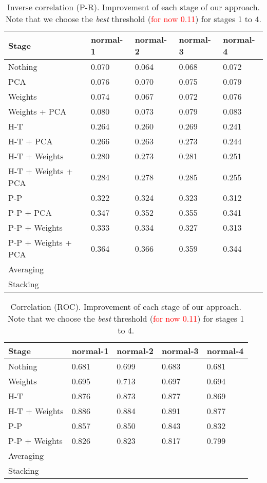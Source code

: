\documentclass[wcp]{jmlr}
\begin{document}
\begin{table}[H]
\centering
\caption{Inverse correlation (P-R). Improvement of each stage of our approach. Note that we choose the
         \textit{best} threshold (\textcolor{red}{for now 0.11}) for stages 1 to 4.}
\begin{tabular}{*{5}{l}}
\toprule
Stage               & normal-1 & normal-2 & normal-3 & normal-4 \\
\midrule
Nothing             & 0.070 & 0.064 & 0.068 & 0.072\\
PCA                 & 0.076 & 0.070 & 0.075 & 0.079\\
Weights             & 0.074 & 0.067 & 0.072 & 0.076\\
Weights + PCA       & 0.080 & 0.073 & 0.079 & 0.083\\
H-T                 & 0.264 & 0.260 & 0.269 & 0.241\\
H-T + PCA           & 0.266 & 0.263 & 0.273 & 0.244\\
H-T + Weights       & 0.280 & 0.273 & 0.281 & 0.251\\
H-T + Weights + PCA & 0.284 & 0.278 & 0.285 & 0.255\\
P-P                 & 0.322 & 0.324 & 0.323 & 0.312\\
P-P + PCA           & 0.347 & 0.352 & 0.355 & 0.341\\
P-P + Weights       & 0.333 & 0.334 & 0.327 & 0.313\\
P-P + Weights + PCA & 0.364 & 0.366 & 0.359 & 0.344\\
Averaging           & & & & \\
Stacking            & & & & \\
\bottomrule
\end{tabular}
\end{table}


\begin{table}[H]
\centering
\caption{Correlation (ROC). Improvement of each stage of our approach. Note that we choose the
         \textit{best} threshold (\textcolor{red}{for now 0.11}) for stages 1 to 4.}
\begin{tabular}{*{5}{l}}
\toprule
Stage               & normal-1 & normal-2 & normal-3 & normal-4 \\
\midrule
Nothing             & 0.681 & 0.699 & 0.683 & 0.681\\
Weights             & 0.695 & 0.713 & 0.697 & 0.694\\
H-T                 & 0.876 & 0.873 & 0.877 & 0.869\\
H-T + Weights       & 0.886 & 0.884 & 0.891 & 0.877\\
P-P                 & 0.857 & 0.850 & 0.843 & 0.832\\
P-P + Weights       & 0.826 & 0.823 & 0.817 & 0.799\\
Averaging           & & & & \\
Stacking            & & & & \\
\bottomrule
\end{tabular}
\end{table}
\end{document}
